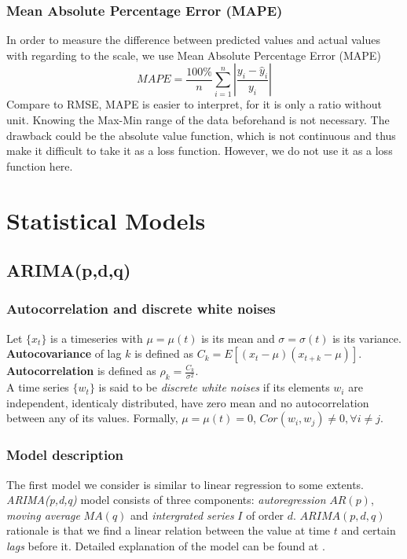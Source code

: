 \documentclass[11pt]{article}
\begin{document}
\subsubsection{Mean Absolute Percentage Error (MAPE)}
In order to measure the difference between predicted values and actual values
with regarding to the scale, we use Mean Absolute Percentage Error (MAPE)
$$
MAPE = \frac{100\%}{n}\sum  _{i=1}^{n}\left| \frac{y_i -\hat{y}_i}{y_i} \right|
$$
Compare to RMSE, MAPE is easier to interpret, for it is only a ratio without
unit. Knowing the Max-Min range of the data beforehand is not necessary. The
drawback could be the absolute value function, which is not continuous and thus
make it difficult to take it as a loss function. However, we do not use it as a
loss function here.

\section{Statistical Models}
\subsection{ARIMA(p,d,q)}
\subsubsection{Autocorrelation and discrete white noises}
Let $\{x_t\}$ is a timeseries with $\mu=\mu(t)$ is its mean and
$\sigma=\sigma(t)$ is its variance. \textbf{Autocovariance} of lag $k$ is
defined as $C_k=E[(x_t-\mu)(x_{t+k}-\mu)]$. \textbf{Autocorrelation} is defined
as $\rho_k=\frac{C_k}{\sigma^2}$.\\
A time series $\{w_t\}$ is said to be \textit{discrete white noises} if its
elements $w_i$ are independent, identicaly distributed, have zero mean and no
autocorrelation between any of its values. Formally, $\mu=\mu(t)=0$,
$Cor(w_i,w_j)\neq 0, \forall i \neq j$.
\subsubsection{Model description}
The first model we consider is similar to linear regression to some extents.
\textit{ARIMA(p,d,q)} model consists of three components: \textit{autoregression}
$AR(p)$, \textit{moving average} $MA(q)$ and \textit{intergrated series} $I$ of
order $d$. $ARIMA(p,d,q)$ rationale is that we find a linear relation between
the value at time $t$ and certain \textit{lags} before it. Detailed explanation
of the model can be found at \cite{GVK4844634242}.\\
\end{document}
